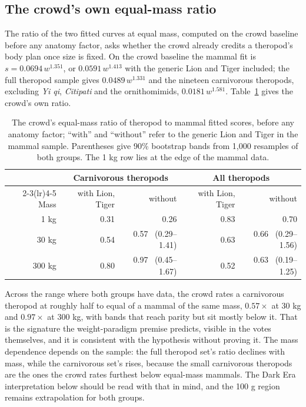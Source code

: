 \documentclass[11pt]{article}
\begin{document}
\subsection{The crowd's own equal-mass ratio}
\label{sec:equalmass}
The ratio of the two fitted curves at equal mass, computed on the crowd baseline before any anatomy factor, asks whether the crowd already credits a theropod's body plan once size is fixed. On the crowd baseline the mammal fit is $s=0.0694\,w^{1.351}$, or $0.0591\,w^{1.413}$ with the generic Lion and Tiger included; the full theropod sample gives $0.0489\,w^{1.331}$ and the nineteen carnivorous theropods, excluding \textit{Yi qi}, \textit{Citipati} and the ornithomimids, $0.0181\,w^{1.581}$. Table~\ref{tab:equalmass} gives the crowd's own ratio.

\begin{table}[H]
\centering
\small
\begin{tabular}{rrrrr}
\toprule
& \multicolumn{2}{c}{Carnivorous theropods} & \multicolumn{2}{c}{All theropods} \\
\cmidrule(lr){2-3}\cmidrule(lr){4-5}
Mass & with Lion, Tiger & without & with Lion, Tiger & without \\
\midrule
1 kg & 0.31 & 0.26 & 0.83 & 0.70 \\
30 kg & 0.54 & 0.57 \ (0.29--1.41) & 0.63 & 0.66 \ (0.29--1.56) \\
300 kg & 0.80 & 0.97 \ (0.45--1.67) & 0.52 & 0.63 \ (0.19--1.25) \\
\bottomrule
\end{tabular}
\caption{The crowd's equal-mass ratio of theropod to mammal fitted scores, before any anatomy factor; ``with'' and ``without'' refer to the generic Lion and Tiger in the mammal sample. Parentheses give 90\% bootstrap bands from 1,000 resamples of both groups. The 1 kg row lies at the edge of the mammal data.}
\label{tab:equalmass}
\end{table}

Across the range where both groups have data, the crowd rates a carnivorous theropod at roughly half to equal of a mammal of the same mass, $0.57\times$ at 30 kg and $0.97\times$ at 300 kg, with bands that reach parity but sit mostly below it. That is the signature the weight-paradigm premise predicts, visible in the votes themselves, and it is consistent with the hypothesis without proving it. The mass dependence depends on the sample: the full theropod set's ratio declines with mass, while the carnivorous set's rises, because the small carnivorous theropods are the ones the crowd rates furthest below equal-mass mammals. The Dark Era interpretation below should be read with that in mind, and the 100 g region remains extrapolation for both groups.
\end{document}
